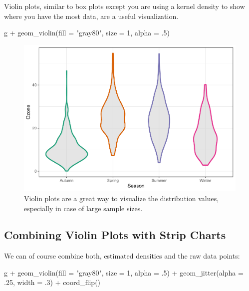 \documentclass[
]{krantz}
\makeatletter
\newenvironment{Shaded}{\begin{snugshade}}{\end{snugshade}}
\newcommand{\AttributeTok}[1]{\textcolor[rgb]{0.61,0.61,0.61}{#1}}
\newcommand{\DecValTok}[1]{\textcolor[rgb]{0.06,0.06,0.06}{#1}}
\newcommand{\FunctionTok}[1]{\textcolor[rgb]{0,0,0}{#1}}
\newcommand{\NormalTok}[1]{#1}
\newcommand{\SpecialCharTok}[1]{\textcolor[rgb]{0,0,0}{#1}}
\newcommand{\StringTok}[1]{\textcolor[rgb]{0.5,0.5,0.5}{#1}}
\newenvironment{kframe}{%
\medskip{}
\setlength{\fboxsep}{.8em}
 \def\at@end@of@kframe{}%
 \ifinner\ifhmode%
  \def\at@end@of@kframe{\end{minipage}}%
  \begin{minipage}{\columnwidth}%
 \fi\fi%
 \def\FrameCommand##1{\hskip\@totalleftmargin \hskip-\fboxsep
 \colorbox{shadecolor}{##1}\hskip-\fboxsep
     \hskip-\linewidth \hskip-\@totalleftmargin \hskip\columnwidth}%
 \MakeFramed {\advance\hsize-\width
   \@totalleftmargin\z@ \linewidth\hsize
   \@setminipage}}%
 {\par\unskip\endMakeFramed%
 \at@end@of@kframe}
\renewenvironment{Shaded}{\begin{kframe}}{\end{kframe}}
\makeatother
\begin{document}
Violin plots, similar to box plots except you are using a kernel density to show where you have the most data, are a useful visualization.

\begin{Shaded}
\begin{Highlighting}[]
\NormalTok{g }\SpecialCharTok{+} \FunctionTok{geom\_violin}\NormalTok{(}\AttributeTok{fill =} \StringTok{"gray80"}\NormalTok{, }\AttributeTok{size =} \DecValTok{1}\NormalTok{, }\AttributeTok{alpha =}\NormalTok{ .}\DecValTok{5}\NormalTok{)}
\end{Highlighting}
\end{Shaded}

\begin{figure}
\centering
\includegraphics{bookdown_files/figure-latex/violin-1.pdf}
\caption{\label{fig:violin}Violin plots are a great way to visualize the distribution values, especially in case of large sample sizes.}
\end{figure}

\hypertarget{combining-violin-plots-with-strip-charts}{%
\subsection{Combining Violin Plots with Strip Charts}\label{combining-violin-plots-with-strip-charts}}

We can of course combine both, estimated densities and the raw data points:

\begin{Shaded}
\begin{Highlighting}[]
\NormalTok{g }\SpecialCharTok{+} \FunctionTok{geom\_violin}\NormalTok{(}\AttributeTok{fill =} \StringTok{"gray80"}\NormalTok{, }\AttributeTok{size =} \DecValTok{1}\NormalTok{, }\AttributeTok{alpha =}\NormalTok{ .}\DecValTok{5}\NormalTok{) }\SpecialCharTok{+}
    \FunctionTok{geom\_jitter}\NormalTok{(}\AttributeTok{alpha =}\NormalTok{ .}\DecValTok{25}\NormalTok{, }\AttributeTok{width =}\NormalTok{ .}\DecValTok{3}\NormalTok{) }\SpecialCharTok{+}
    \FunctionTok{coord\_flip}\NormalTok{()}
\end{Highlighting}
\end{Shaded}
\end{document}
